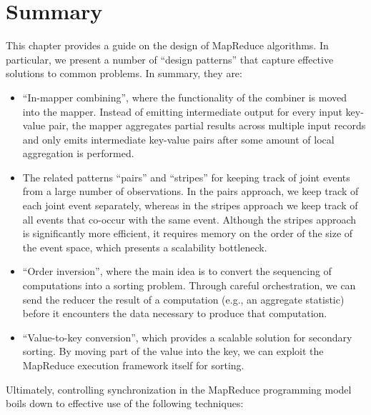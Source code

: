 \section{Summary}

This chapter provides a guide on the design of MapReduce algorithms.
In particular, we present a number of ``design patterns'' that capture
effective solutions to common problems.  In summary, they are:

\begin{itemize}

\item ``In-mapper combining'', where the functionality of the combiner
  is moved into the mapper.  Instead of emitting intermediate output
  for every input key-value pair, the mapper aggregates partial
  results across multiple input records and only emits intermediate
  key-value pairs after some amount of local aggregation is performed.

\item The related patterns ``pairs'' and ``stripes'' for keeping track
  of joint events from a large number of observations.  In the pairs
  approach, we keep track of each joint event separately, whereas in
  the stripes approach we keep track of all events that co-occur with
  the same event.  Although the stripes approach is significantly more
  efficient, it requires memory on the order of the size of the event
  space, which presents a scalability bottleneck.

\item ``Order inversion'', where the main idea is to convert the
  sequencing of computations into a sorting problem.  Through careful
  orchestration, we can send the reducer the result of a computation
  (e.g., an aggregate statistic) before it encounters the data
  necessary to produce that computation.

\item ``Value-to-key conversion'', which provides a scalable solution
  for secondary sorting.  By moving part of the value into the key, we
  can exploit the MapReduce execution framework itself for sorting.

\end{itemize}

\noindent Ultimately, controlling synchronization in the MapReduce
programming model boils down to effective use of the following
techniques:


